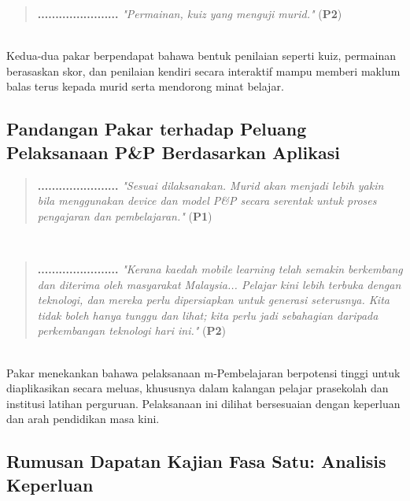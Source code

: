{{\begin{quote}
\begin{center}
\textbf{.......................} \textit{"Permainan, kuiz yang menguji murid."} (\textbf{P2})
\end{center}
\end{quote}\\

Kedua-dua pakar berpendapat bahawa bentuk penilaian seperti kuiz, permainan berasaskan skor, dan penilaian kendiri secara interaktif mampu memberi maklum balas terus kepada murid serta mendorong minat belajar.

\subsection{Pandangan Pakar terhadap Peluang Pelaksanaan P\&P Berdasarkan Aplikasi }

\begin{quote}
\begin{center}
\textbf{.......................} \textit{"Sesuai dilaksanakan. Murid akan menjadi lebih yakin bila menggunakan \textit{device} dan model P\&P secara serentak untuk proses pengajaran dan pembelajaran."} (\textbf{P1})
\end{center}
\end{quote}\\

\begin{quote}
\begin{center}
\textbf{.......................} \textit{"Kerana kaedah \textit{mobile learning} telah semakin berkembang dan diterima oleh masyarakat Malaysia... Pelajar kini lebih terbuka dengan teknologi, dan mereka perlu dipersiapkan untuk generasi seterusnya. Kita tidak boleh hanya tunggu dan lihat; kita perlu jadi sebahagian daripada perkembangan teknologi hari ini."} (\textbf{P2})
\end{center}
\end{quote}\\

Pakar menekankan bahawa pelaksanaan m-Pembelajaran berpotensi tinggi untuk diaplikasikan secara meluas, khususnya dalam kalangan pelajar prasekolah dan institusi latihan perguruan. Pelaksanaan ini dilihat bersesuaian dengan keperluan dan arah pendidikan masa kini.
\clearpage


\subsection{Rumusan Dapatan Kajian Fasa Satu: Analisis Keperluan}

}}
